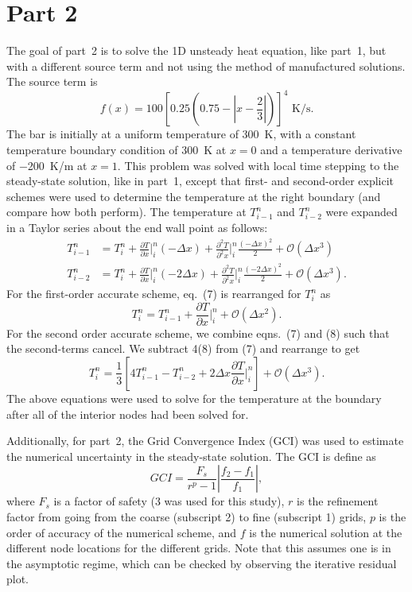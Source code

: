 \documentclass[11pt, letterpaper]{article}
\newcommand{\p}{\partial}
\begin{document}
\section{Part 2}

The goal of part~2 is to solve the 1D unsteady heat equation, like part~1, but
with a different source term and not using the method of manufactured solutions.
The source term is
%
\begin{equation}
	\label{p2_fx}
	f(x) = 100 \left[ 0.25 \left( 0.75 - \left| x - \frac{2}{3} \right| \right) \right] ^ 4 
	\mbox{ K/s}.
\end{equation}
%
The bar is initially at a uniform temperature of \SI{300}{K}, with a constant temperature
boundary condition of \SI{300}{K} at $x=0$ and a temperature derivative of \SI{-200}{K/m}
at $x=1$.  This problem was solved with local time stepping to the steady-state solution,
like in part~1, except that first- and second-order explicit schemes were used
to determine the temperature at the right boundary (and compare how both
perform).  The temperature at $T_{i-1}^n$ and
$T_{i-2}^n$ were expanded in a Taylor series about the end wall point as follows:
%
\begin{align}	
	T_{i-1}^n &= T_i^n + \frac{\p T}{\p x}\bigg|_{i}^n (-\Delta x) + 
				\frac{\p^2 T}{\p^2 x}\bigg|_{i}^n \frac{(-\Delta x)^2}{2} + 
				\mathcal{O}(\Delta x^3) \label{eqn:O1} \\
	T_{i-2}^n &= T_i^n + \frac{\p T}{\p x}\bigg|_{i}^n (-2\Delta x) + 
				\frac{\p^2 T}{\p^2 x}\bigg|_{i}^n \frac{(-2\Delta x)^2}{2} +
				\mathcal{O}(\Delta x^3) \label{eqn:O2}.
\end{align}
%
For the first-order accurate scheme, eq.~(7) is rearranged for $T_i^n$ as
%
\begin{equation}
	T_{i}^n = T_{i-1}^n + \frac{\p T}{\p x}\bigg|_{i}^n + \mathcal{O}(\Delta x^2).
\end{equation}
%
For the second order accurate scheme, we combine eqns.~(7) and (8) such that the
second-terms cancel.  We subtract 4(8) from (7) and rearrange to get
%
\begin{equation}
	T_i^n = \frac{1}{3} \left[ 4 T_{i-1}^n - T_{i-2}^n + 
	2\Delta x \frac{\p T}{\p x}\bigg|_{i}^n \right] + \mathcal{O}(\Delta x^3).
\end{equation}
%
The above equations were used to solve for the temperature at the boundary after all of
the interior nodes had been solved for.

Additionally, for part~2, the Grid Convergence Index (GCI) was used to estimate
the numerical uncertainty in the steady-state solution.  The GCI is define as
%
\begin{equation}
	\label{eqn:gci}
	GCI = \frac{F_s}{r^p - 1} \left| \frac{f_2 - f_1}{f_1} \right|,
\end{equation}
%
where $F_s$ is a factor of safety (3 was used for this study), $r$ is the refinement
factor from going from the coarse (subscript 2) to fine (subscript 1) grids, $p$ is
the order of accuracy of the numerical scheme, and $f$ is the numerical solution at
the different node locations for the different grids.  Note that this assumes one
is in the asymptotic regime, which can be checked by observing the iterative
residual plot.
\end{document}
